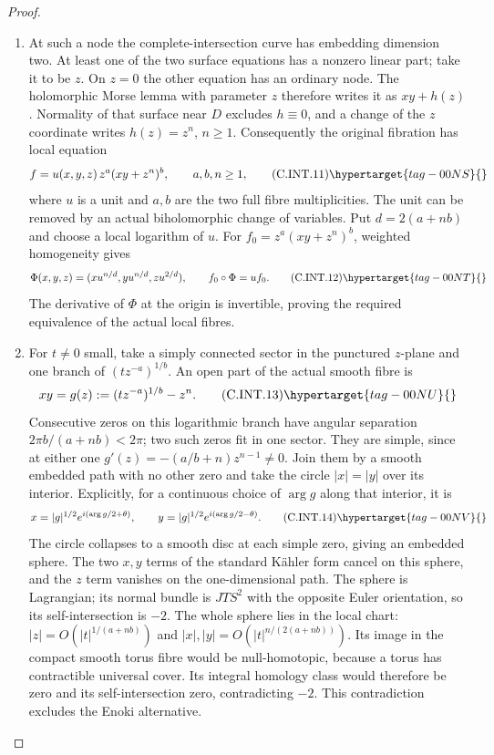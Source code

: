 \begin{proof}
\begin{enumerate}[label={$\langle1\rangle$\arabic*.},leftmargin=*]
\item At such a node the complete-intersection curve
has embedding dimension two. At least one of
the two surface equations has a nonzero linear
part; take it to be $z$. On $z=0$ the other
equation has an ordinary node. The holomorphic
Morse lemma with parameter $z$ therefore writes
it as $xy+h(z)$. Normality of that surface near
$D$ excludes $h\equiv0$, and a change of the
$z$ coordinate writes $h(z)=z^n$, $n\ge1$.
Consequently the original fibration has local
equation
\[
 f=u(x,y,z)\,z^a(xy+z^n)^b,
 \qquad a,b,n\ge1,
 \tag{C.INT.11}\hypertarget{tag-00NS}{}\label{cdp:eq:C.INT.11}
\]
where $u$ is a unit and $a,b$ are the two full
fibre multiplicities. The unit can be removed
by an actual biholomorphic change of variables.
Put $d=2(a+nb)$ and choose a local logarithm of
$u$. For $f_0=z^a(xy+z^n)^b$, weighted homogeneity
gives
\[
 \Phi(x,y,z)=(x u^{n/d},y u^{n/d},z u^{2/d}),
 \qquad f_0\circ\Phi=u f_0.
 \tag{C.INT.12}\hypertarget{tag-00NT}{}\label{cdp:eq:C.INT.12}
\]
The derivative of $\Phi$ at the origin is
invertible, proving the required equivalence
of the actual local fibres.

\item For $t\ne0$ small, take a simply connected
sector in the punctured $z$-plane and one
branch of $(t z^{-a})^{1/b}$. An open part
of the actual smooth fibre is
\[
 xy=g(z):=(t z^{-a})^{1/b}-z^n.
 \tag{C.INT.13}\hypertarget{tag-00NU}{}\label{cdp:eq:C.INT.13}
\]
Consecutive zeros on this logarithmic branch
have angular separation $2\pi b/(a+nb)<2\pi$;
two such zeros fit in one sector. They are
simple, since at either one
$g'(z)=-(a/b+n)z^{n-1}\ne0$.
Join them by a smooth embedded path with no
other zero and take the circle $|x|=|y|$
over its interior. Explicitly, for a continuous
choice of $\arg g$ along that interior, it is
\[
 x=|g|^{1/2}e^{i(\arg g/2+\theta)},\qquad
 y=|g|^{1/2}e^{i(\arg g/2-\theta)}.
 \tag{C.INT.14}\hypertarget{tag-00NV}{}\label{cdp:eq:C.INT.14}
\]
The circle collapses to a smooth disc at each
simple zero, giving an embedded sphere.
The two $x,y$ terms of the standard K\"ahler
form cancel on this sphere, and the $z$ term
vanishes on the one-dimensional path. The
sphere is Lagrangian; its normal bundle is
$JTS^2$ with the opposite Euler orientation,
so its self-intersection is $-2$.
The whole sphere lies in the local chart:
$|z|=O(|t|^{1/(a+nb)})$ and
$|x|,|y|=O(|t|^{n/(2(a+nb))})$.
Its image in the compact smooth torus fibre
would be null-homotopic, because a torus has
contractible universal cover. Its integral
homology class would therefore be zero and
its self-intersection zero, contradicting
$-2$. This contradiction excludes the Enoki
alternative.

\end{enumerate}
\end{proof}